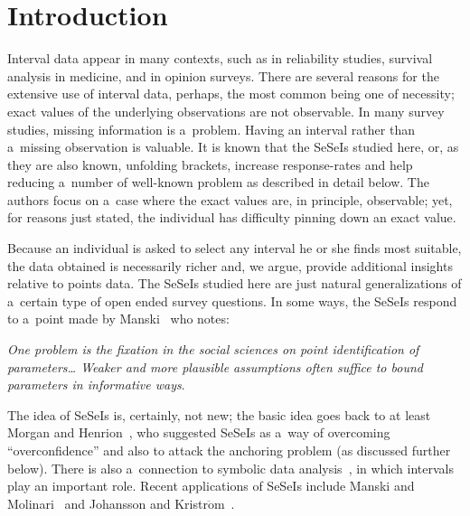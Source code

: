       \begin{multicols}{2}

                  \label{st\stat}


\section{Introduction}

\noindent
 Interval data appear in many contexts, such as in reliability studies, survival analysis in medicine,
 and in opinion surveys. There are several reasons for the extensive use of interval data, perhaps,
 the most common being one of necessity; exact values of the underlying observations are not observable.
 In many survey studies, missing information is a~problem. Having an interval rather than a~missing
 observation is valuable. It is known that the SeSeIs studied here, or,
 as they are also known, unfolding brackets, increase response-rates and help reducing a~number
 of well-known problem as described in detail below.
The authors focus on a~case where the exact values are, in principle, observable; yet, for reasons just stated,
 the individual has difficulty pinning down an exact value.

 Because an individual is asked to select any interval he or she finds most suitable, the data obtained
 is necessarily richer and, we argue, provide additional insights relative to points data. The SeSeIs
 studied here are just natural generalizations of a~certain type of open ended survey questions.
 In some ways, the SeSeIs respond to a~point made by  Manski~\cite{BK:MA99} who notes:

\hangindent=3mm\noindent
\textit{One problem is the fixation in the social sciences on point identification of parameters\ldots
  Weaker and more plausible assumptions often suffice to bound parameters in informative ways}.

\noindent
The idea of SeSeIs is, certainly, not new; the basic idea goes back to at least 
Morgan and
Henrion~\cite{BK:MH90}, who suggested SeSeIs as a~way of overcoming 
``overconfidence'' and also to attack the
anchoring problem (as discussed further below). There is also a~connection to 
symbolic data analysis~\cite{BK:BD06}, in which intervals play an important role. Recent
applications of SeSeIs include Manski and Molinari~\cite{BK:MM10} and 
Johansson and Kristr$\ddot{\mbox{o}}$m~\cite{BK:JK12}.



\end{multicols}
